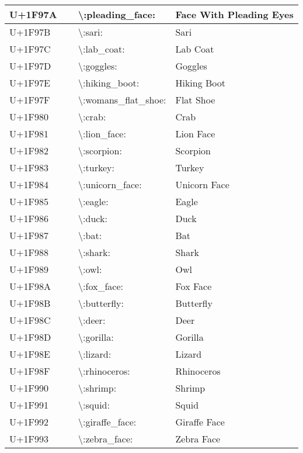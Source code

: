\begin{table}[h]
\begin{tabulary}{\linewidth}{|L|L|L|L|}
\hline
U+1F97A & 🥺 & {\textbackslash}:pleading\_face: & Face With Pleading Eyes \\
\hline
U+1F97B & 🥻 & {\textbackslash}:sari: & Sari \\
\hline
U+1F97C & 🥼 & {\textbackslash}:lab\_coat: & Lab Coat \\
\hline
U+1F97D & 🥽 & {\textbackslash}:goggles: & Goggles \\
\hline
U+1F97E & 🥾 & {\textbackslash}:hiking\_boot: & Hiking Boot \\
\hline
U+1F97F & 🥿 & {\textbackslash}:womans\_flat\_shoe: & Flat Shoe \\
\hline
U+1F980 & 🦀 & {\textbackslash}:crab: & Crab \\
\hline
U+1F981 & 🦁 & {\textbackslash}:lion\_face: & Lion Face \\
\hline
U+1F982 & 🦂 & {\textbackslash}:scorpion: & Scorpion \\
\hline
U+1F983 & 🦃 & {\textbackslash}:turkey: & Turkey \\
\hline
U+1F984 & 🦄 & {\textbackslash}:unicorn\_face: & Unicorn Face \\
\hline
U+1F985 & 🦅 & {\textbackslash}:eagle: & Eagle \\
\hline
U+1F986 & 🦆 & {\textbackslash}:duck: & Duck \\
\hline
U+1F987 & 🦇 & {\textbackslash}:bat: & Bat \\
\hline
U+1F988 & 🦈 & {\textbackslash}:shark: & Shark \\
\hline
U+1F989 & 🦉 & {\textbackslash}:owl: & Owl \\
\hline
U+1F98A & 🦊 & {\textbackslash}:fox\_face: & Fox Face \\
\hline
U+1F98B & 🦋 & {\textbackslash}:butterfly: & Butterfly \\
\hline
U+1F98C & 🦌 & {\textbackslash}:deer: & Deer \\
\hline
U+1F98D & 🦍 & {\textbackslash}:gorilla: & Gorilla \\
\hline
U+1F98E & 🦎 & {\textbackslash}:lizard: & Lizard \\
\hline
U+1F98F & 🦏 & {\textbackslash}:rhinoceros: & Rhinoceros \\
\hline
U+1F990 & 🦐 & {\textbackslash}:shrimp: & Shrimp \\
\hline
U+1F991 & 🦑 & {\textbackslash}:squid: & Squid \\
\hline
U+1F992 & 🦒 & {\textbackslash}:giraffe\_face: & Giraffe Face \\
\hline
U+1F993 & 🦓 & {\textbackslash}:zebra\_face: & Zebra Face \\

\end{tabulary}
\end{table}
